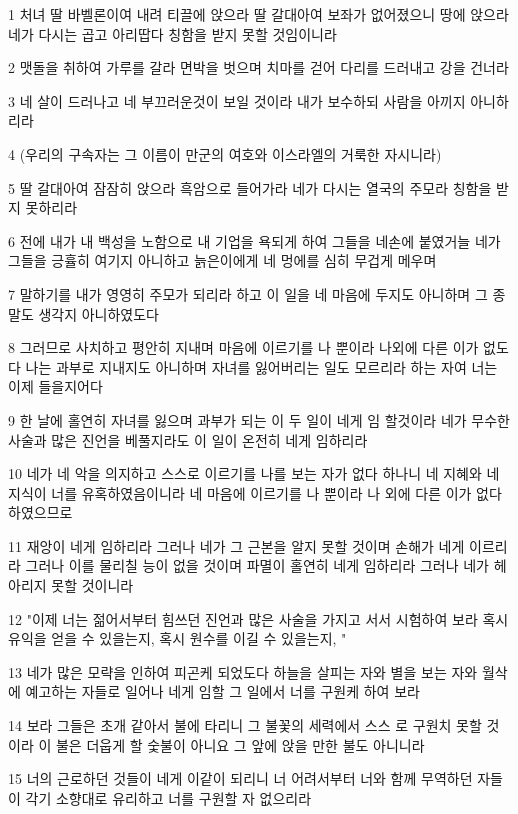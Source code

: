\par 1 처녀 딸 바벨론이여 내려 티끌에 앉으라 딸 갈대아여 보좌가 없어졌으니 땅에 앉으라 네가 다시는 곱고 아리땁다 칭함을 받지 못할 것임이니라
\par 2 맷돌을 취하여 가루를 갈라 면박을 벗으며 치마를 걷어 다리를 드러내고 강을 건너라
\par 3 네 살이 드러나고 네 부끄러운것이 보일 것이라 내가 보수하되 사람을 아끼지 아니하리라
\par 4 (우리의 구속자는 그 이름이 만군의 여호와 이스라엘의 거룩한 자시니라)
\par 5 딸 갈대아여 잠잠히 앉으라 흑암으로 들어가라 네가 다시는 열국의 주모라 칭함을 받지 못하리라
\par 6 전에 내가 내 백성을 노함으로 내 기업을 욕되게 하여 그들을 네손에 붙였거늘 네가 그들을 긍휼히 여기지 아니하고 늙은이에게 네 멍에를 심히 무겁게 메우며
\par 7 말하기를 내가 영영히 주모가 되리라 하고 이 일을 네 마음에 두지도 아니하며 그 종말도 생각지 아니하였도다
\par 8 그러므로 사치하고 평안히 지내며 마음에 이르기를 나 뿐이라 나외에 다른 이가 없도다 나는 과부로 지내지도 아니하며 자녀를 잃어버리는 일도 모르리라 하는 자여 너는 이제 들을지어다
\par 9 한 날에 홀연히 자녀를 잃으며 과부가 되는 이 두 일이 네게 임 할것이라 네가 무수한 사술과 많은 진언을 베풀지라도 이 일이 온전히 네게 임하리라
\par 10 네가 네 악을 의지하고 스스로 이르기를 나를 보는 자가 없다 하나니 네 지혜와 네 지식이 너를 유혹하였음이니라 네 마음에 이르기를 나 뿐이라 나 외에 다른 이가 없다 하였으므로
\par 11 재앙이 네게 임하리라 그러나 네가 그 근본을 알지 못할 것이며 손해가 네게 이르리라 그러나 이를 물리칠 능이 없을 것이며 파멸이 홀연히 네게 임하리라 그러나 네가 헤아리지 못할 것이니라
\par 12 "이제 너는 젊어서부터 힘쓰던 진언과 많은 사술을 가지고 서서 시험하여 보라 혹시 유익을 얻을 수 있을는지, 혹시 원수를 이길 수 있을는지, "
\par 13 네가 많은 모략을 인하여 피곤케 되었도다 하늘을 살피는 자와 별을 보는 자와 월삭에 예고하는 자들로 일어나 네게 임할 그 일에서 너를 구원케 하여 보라
\par 14 보라 그들은 초개 같아서 불에 타리니 그 불꽃의 세력에서 스스 로 구원치 못할 것이라 이 불은 더웁게 할 숯불이 아니요 그 앞에 앉을 만한 불도 아니니라
\par 15 너의 근로하던 것들이 네게 이같이 되리니 너 어려서부터 너와 함께 무역하던 자들이 각기 소향대로 유리하고 너를 구원할 자 없으리라

